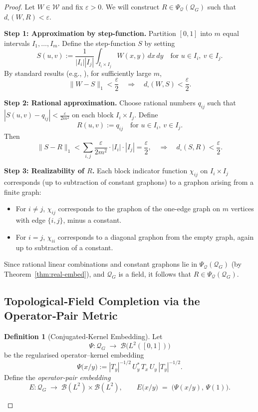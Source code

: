 \documentclass[11pt]{article}
\theoremstyle{definition}
\newtheorem{definition}{Definition}[section]
\theoremstyle{plain}
\theoremstyle{remark}
\begin{document}
\begin{proof}
Let \(W \in \mathcal{W}\) and fix \(\varepsilon > 0\). We will construct \(R \in \Psi_{\mathcal Q}(\mathcal Q_G)\) such that \(d_\square(W, R) < \varepsilon\).

\textbf{Step 1: Approximation by step-function.}
Partition \([0,1]\) into \(m\) equal intervals \(I_1, \dots, I_m\). Define the step-function \(S\) by setting
\[
  S(u,v) := \frac{1}{|I_i||I_j|} \int_{I_i \times I_j} W(x,y)\,dx\,dy
  \quad \text{for } u \in I_i,\ v \in I_j.
\]
By standard results (e.g., \cite{Lovasz2012}), for sufficiently large \(m\),
\[
  \|W - S\|_1 < \frac{\varepsilon}{2}
  \quad \Rightarrow \quad
  d_\square(W, S) < \frac{\varepsilon}{2}.
\]

\textbf{Step 2: Rational approximation.}
Choose rational numbers \(q_{ij}\) such that \(|S(u,v) - q_{ij}| < \frac{\varepsilon}{2m^2}\) on each block \(I_i \times I_j\). Define
\[
  R(u,v) := q_{ij} \quad \text{for } u \in I_i,\ v \in I_j.
\]
Then
\[
  \|S - R\|_1 < \sum_{i,j} \frac{\varepsilon}{2m^2} \cdot |I_i| \cdot |I_j|
  = \frac{\varepsilon}{2},
  \quad \Rightarrow \quad
  d_\square(S, R) < \frac{\varepsilon}{2}.
\]

\textbf{Step 3: Realizability of \(R\).}
Each block indicator function \(\chi_{ij}\) on \(I_i \times I_j\) corresponds (up to subtraction of constant graphons) to a graphon arising from a finite graph:
\begin{itemize}
  \item For \(i \ne j\), \(\chi_{ij}\) corresponds to the graphon of the one-edge graph on \(m\) vertices with edge \(\{i,j\}\), minus a constant.
  \item For \(i = j\), \(\chi_{ii}\) corresponds to a diagonal graphon from the empty graph, again up to subtraction of a constant.
\end{itemize}
Since rational linear combinations and constant graphons lie in \(\Psi_{\mathcal Q}(\mathcal Q_G)\) (by Theorem~\ref{thm:real-embed}), and \(\mathcal Q_G\) is a field, it follows that \(R \in \Psi_{\mathcal Q}(\mathcal Q_G)\).
\subsection{Topological‐Field Completion via the Operator‐Pair Metric}

\begin{definition}[Conjugated‐Kernel Embedding]
Let 
\[
\Psi:\mathcal Q_G\;\longrightarrow\;\mathcal B\bigl(L^2([0,1])\bigr)
\]
be the regularised operator–kernel embedding 
\[
\Psi\bigl(x/y\bigr)
:=|T_y|^{-1/2}\,U_y^*\,T_x\,U_y\,|T_y|^{-1/2}.
\]
Define the \emph{operator‐pair embedding}
\[
E:\mathcal Q_G
\;\longrightarrow\;
\mathcal B(L^2)\times\mathcal B(L^2),
\qquad
E\bigl(x/y\bigr) \;=\;\bigl(\Psi(x/y),\,\Psi(1)\bigr).
\]
\end{definition}


\end{proof}
\end{document}

